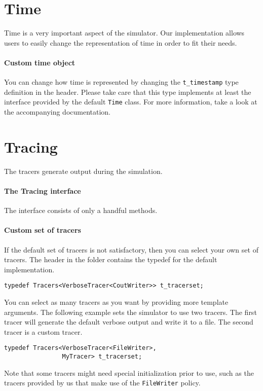 \lstset{
    frameround=fttt,
    language=C++,
    breaklines=true,
}

\section{Time}
Time is a very important aspect of the simulator. Our implementation allows users to easily change the representation of time in order to fit their needs.
\paragraph{Custom time object}
You can change how time is represented by changing the \lstinline{t_timestamp} type definition in the  header. Please take care that this type implements at least the interface provided by the default \lstinline{Time} class. For more information, take a look at the accompanying documentation.

\section{Tracing}
The tracers generate output during the simulation.
\label{sec:Tracing}
\paragraph{The Tracing interface}
The interface consists of only a handful methods.
\paragraph{Custom set of tracers}
If the default set of tracers is not satisfactory, then you can select your own set of tracers. The header  in the folder  contains the typedef for the default implementation.
\begin{lstlisting}
typedef Tracers<VerboseTracer<CoutWriter>> t_tracerset;
\end{lstlisting}
You can select as many tracers as you want by providing more template arguments. The following example sets the simulator to use two tracers. The first tracer will generate the default verbose output and write it to a file. The second tracer is a custom tracer.
\begin{lstlisting}
typedef Tracers<VerboseTracer<FileWriter>,
                MyTracer> t_tracerset;
\end{lstlisting}
Note that some tracers might need special initialization prior to use, such as the tracers provided by us that make use of the \lstinline{FileWriter} policy.

